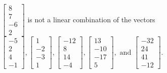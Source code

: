 \begin{exercise}
\begin{exerciseStatement}
  \end{exerciseStatement}
  \begin{exerciseAnswer}
   \(\left[\begin{array}{c}
8 \\
7 \\
-6 \\
2
\end{array}\right]\) 
  	 is not  
	a linear combination of the vectors \(\left[\begin{array}{c}
-5 \\
2 \\
4 \\
-1
\end{array}\right] , \left[\begin{array}{c}
1 \\
-2 \\
-3 \\
1
\end{array}\right] , \left[\begin{array}{c}
-12 \\
8 \\
14 \\
-4
\end{array}\right] , \left[\begin{array}{c}
13 \\
-10 \\
-17 \\
5
\end{array}\right] , \text{ and } \left[\begin{array}{c}
-32 \\
24 \\
41 \\
-12
\end{array}\right]\).

	
  


  \end{exerciseAnswer}
\end{exercise}
